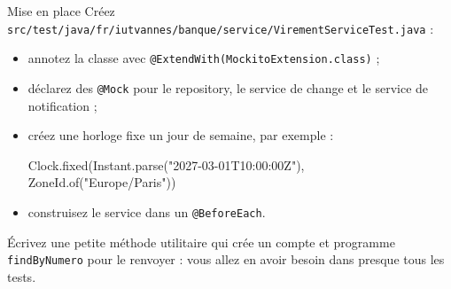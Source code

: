 \documentclass[11pt]{article}
\begin{document}
\begin{exobox}{Mise en place}
Créez \texttt{src/test/java/fr/iutvannes/banque/service/VirementServiceTest.java} :
\begin{itemize}[leftmargin=1.2em]
  \item annotez la classe avec \texttt{@ExtendWith(MockitoExtension.class)} ;
  \item déclarez des \texttt{@Mock} pour le repository, le service de change et le service de notification ;
  \item créez une horloge fixe un jour de semaine, par exemple :
\begin{codebox}
Clock.fixed(Instant.parse("2027-03-01T10:00:00Z"),
            ZoneId.of("Europe/Paris"))
\end{codebox}
  \item construisez le service dans un \texttt{@BeforeEach}.
\end{itemize}
Écrivez une petite méthode utilitaire qui crée un compte et programme \texttt{findByNumero} pour le renvoyer : vous allez en avoir besoin dans presque tous les tests.
\end{exobox}
\end{document}
